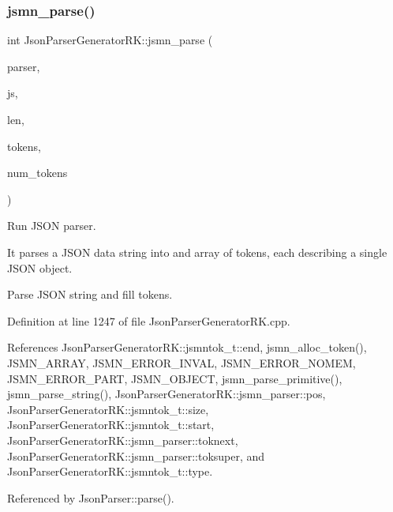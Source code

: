\subsubsection{jsmn\+\_\+parse()}
{\footnotesize\ttfamily int Json\+Parser\+Generator\+R\+K\+::jsmn\+\_\+parse (\begin{DoxyParamCaption}\item[{\textbf{ jsmn\+\_\+parser} $\ast$}]{parser,  }\item[{const char $\ast$}]{js,  }\item[{size\+\_\+t}]{len,  }\item[{\textbf{ jsmntok\+\_\+t} $\ast$}]{tokens,  }\item[{unsigned int}]{num\+\_\+tokens }\end{DoxyParamCaption})}



Run J\+S\+ON parser. 

It parses a J\+S\+ON data string into and array of tokens, each describing a single J\+S\+ON object.

Parse J\+S\+ON string and fill tokens. 

Definition at line 1247 of file Json\+Parser\+Generator\+R\+K.\+cpp.



References Json\+Parser\+Generator\+R\+K\+::jsmntok\+\_\+t\+::end, jsmn\+\_\+alloc\+\_\+token(), J\+S\+M\+N\+\_\+\+A\+R\+R\+AY, J\+S\+M\+N\+\_\+\+E\+R\+R\+O\+R\+\_\+\+I\+N\+V\+AL, J\+S\+M\+N\+\_\+\+E\+R\+R\+O\+R\+\_\+\+N\+O\+M\+EM, J\+S\+M\+N\+\_\+\+E\+R\+R\+O\+R\+\_\+\+P\+A\+RT, J\+S\+M\+N\+\_\+\+O\+B\+J\+E\+CT, jsmn\+\_\+parse\+\_\+primitive(), jsmn\+\_\+parse\+\_\+string(), Json\+Parser\+Generator\+R\+K\+::jsmn\+\_\+parser\+::pos, Json\+Parser\+Generator\+R\+K\+::jsmntok\+\_\+t\+::size, Json\+Parser\+Generator\+R\+K\+::jsmntok\+\_\+t\+::start, Json\+Parser\+Generator\+R\+K\+::jsmn\+\_\+parser\+::toknext, Json\+Parser\+Generator\+R\+K\+::jsmn\+\_\+parser\+::toksuper, and Json\+Parser\+Generator\+R\+K\+::jsmntok\+\_\+t\+::type.



Referenced by Json\+Parser\+::parse().


